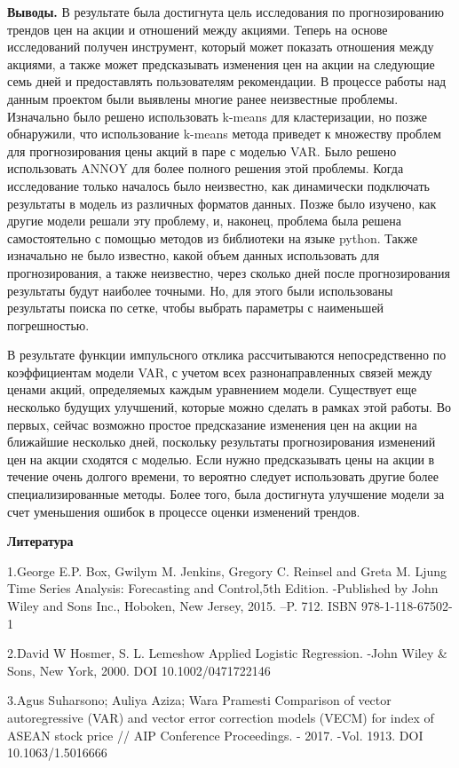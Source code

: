{{\bfseries Выводы.} В результате была достигнута цель исследования по
прогнозированию трендов цен на акции и отношений между акциями. Теперь
на основе исследований получен инструмент, который может показать
отношения между акциями, а также может предсказывать изменения цен на
акции на следующие семь дней и предоставлять пользователям рекомендации.
В процессе работы над данным проектом были выявлены многие ранее
неизвестные проблемы. Изначально было решено использовать k-means для
кластеризации, но позже обнаружили, что использование k-means метода
приведет к множеству проблем для прогнозирования цены акций в паре с
моделью VAR. Было решено использовать ANNOY для более полного решения
этой проблемы. Когда исследование только началось было неизвестно, как
динамически подключать результаты в модель из различных форматов данных.
Позже было изучено, как другие модели решали эту проблему, и, наконец,
проблема была решена самостоятельно с помощью методов из библиотеки на
языке python. Также изначально не было известно, какой объем данных
использовать для прогнозирования, а также неизвестно, через сколько дней
после прогнозирования результаты будут наиболее точными. Но, для этого
были использованы результаты поиска по сетке, чтобы выбрать параметры с
наименьшей погрешностью.

В результате функции импульсного отклика рассчитываются непосредственно
по коэффициентам модели VAR, с учетом всех разнонаправленных связей
между ценами акций, определяемых каждым уравнением модели. Существует
еще несколько будущих улучшений, которые можно сделать в рамках этой
работы. Во первых, сейчас возможно простое предсказание изменения цен на
акции на ближайшие несколько дней, поскольку результаты прогнозирования
изменений цен на акции сходятся с моделью. Если нужно предсказывать цены
на акции в течение очень долгого времени, то вероятно следует
использовать другие более специализированные методы. Более того, была
достигнута улучшение модели за счет уменьшения ошибок в процессе оценки
изменений трендов.

{\bfseries Литература}

1.George E.P. Box, Gwilym M. Jenkins, Gregory C. Reinsel and Greta M.
Ljung Time Series Analysis: Forecasting and Control,5th Edition.
-Published by John Wiley and Sons Inc., Hoboken, New Jersey, 2015. --P.
712. ISBN 978-1-118-67502-1

2.David W Hosmer, S. L. Lemeshow Applied Logistic Regression. -John
Wiley \& Sons, New York, 2000. DOI 10.1002/0471722146

3.Agus Suharsono; Auliya Aziza; Wara Pramesti Comparison of vector
autoregressive (VAR) and vector error correction models (VECM) for index
of ASEAN stock price // AIP Conference Proceedings. - 2017. -Vol. 1913.
DOI 10.1063/1.5016666

}
